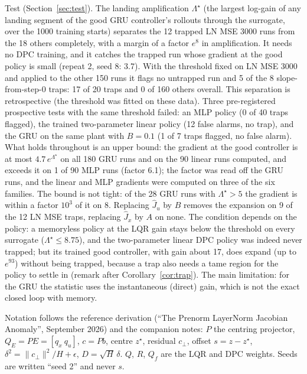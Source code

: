 \documentclass[11pt]{article}
\theoremstyle{plainnote}
\newcommand{\cp}{c_\perp}
\newcommand{\Jx}{\hat J_x}
\newcommand{\Ju}{\hat J_u}
\begin{document}
Test (Section~\ref{sec:test}). The landing amplification $\Lambda^\star$ (the largest log-gain of any landing segment of the good GRU controller's rollouts through the surrogate, over the 1000 training starts) separates the 12 trapped LN MSE 3000 runs from the 18 others completely, with a margin of a factor $e^{8}$ in amplification. It needs no DPC training, and it catches the trapped run whose gradient at the good policy is small (repeat 2, seed 8: 3.7). With the threshold fixed on LN MSE 3000 and applied to the other 150 runs it flags no untrapped run and 5 of the 8 slope-from-step-0 traps: 17 of 20 traps and 0 of 160 others overall. This separation is retrospective (the threshold was fitted on these data). Three pre-registered prospective tests with the same threshold failed: an MLP policy (0 of 40 traps flagged), the trained two-parameter linear policy (12 false alarms, no trap), and the GRU on the same plant with $B=0.1$ (1 of 7 traps flagged, no false alarm). What holds throughout is an upper bound: the gradient at the good controller is at most $4.7\,e^{\Lambda^\star}$ on all 180 GRU runs and on the 90 linear runs computed, and exceeds it on 1 of 90 MLP runs (factor 6.1); the factor was read off the GRU runs, and the linear and MLP gradients were computed on three of the six families. The bound is not tight: of the 28 GRU runs with $\Lambda^\star>5$ the gradient is within a factor $10^3$ of it on 8. Replacing $\Ju$ by $B$ removes the expansion on 9 of the 12 LN MSE traps, replacing $\Jx$ by $A$ on none. The condition depends on the policy: a memoryless policy at the LQR gain stays below the threshold on every surrogate ($\Lambda^\star\le8.75$), and the two-parameter linear DPC policy was indeed never trapped; but its trained good controller, with gain about 17, does expand (up to $e^{93}$) without being trapped, because a trap also needs a tame region for the policy to settle in (remark after Corollary~\ref{cor:trap}). The main limitation: for the GRU the statistic uses the instantaneous (direct) gain, which is not the exact closed loop with memory.

Notation follows the reference derivation (``The Prenorm LayerNorm Jacobian Anomaly'', September 2026) and the companion notes: $P$ the centring projector, $Q_E=PE=[q_x\ q_u]$, $c=Pb$, centre $z^\star$, residual $\cp$, offset $s=z-z^\star$, $\delta^2=\|\cp\|^2/H+\epsilon$, $D=\sqrt H\,\delta$. $Q$, $R$, $Q_f$ are the LQR and DPC weights. Seeds are written ``seed 2'' and never $s$.

\end{document}
